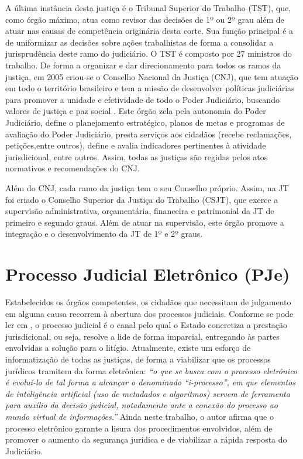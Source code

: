 A última instância desta justiça é o Tribunal Superior do Trabalho (TST), que, como órgão máximo, atua como revisor das decisões de 1º ou 2º grau além de atuar nas causas de competência originária desta corte.  Sua função principal é a de uniformizar as decisões sobre ações trabalhistas de forma a consolidar a jurisprudência deste ramo do judiciário. O TST é composto por 27 ministros do trabalho.
De forma a organizar e dar direcionamento para todos os ramos da justiça, em 2005 criou-se o Conselho Nacional da Justiça (CNJ), que tem atuação em todo o território brasileiro e tem a missão de desenvolver políticas judiciárias para promover a unidade e efetividade de todo o Poder Judiciário, buscando valores de justiça e paz social \cite{sitecnj}. Este órgão zela pela autonomia do Poder Judiciário, define o planejamento estratégico, planos de metas e programas de avaliação do Poder Judiciário, presta serviços aos cidadãos (recebe reclamações, petições,entre outros), define e avalia indicadores pertinentes à atividade jurisdicional, entre outros.   Assim, todas as justiças são regidas pelos atos normativos e recomendações do CNJ.      

Além do CNJ, cada ramo da justiça tem o seu Conselho próprio. Assim, na JT foi criado o Conselho Superior da Justiça do Trabalho (CSJT), que exerce a supervisão administrativa, orçamentária, financeira e patrimonial da JT de primeiro e segundo graus. Além de atuar na supervisão, este órgão promove a integração e o desenvolvimento da JT de 1º e 2º graus. 


\section{Processo Judicial Eletrônico (PJe)}%

Estabelecidos os órgãos competentes, os cidadãos que necessitam de julgamento em alguma causa recorrem à abertura dos processos judiciais. Conforme se pode ler em \cite{carvalho_o_2017}, o processo judicial é o canal pelo qual o Estado concretiza a prestação jurisdicional, ou seja, resolve a lide de forma imparcial, entregando às partes envolvidas a solução para o litígio. Atualmente, existe um esforço de informatização de todas as justiças, de forma a viabilizar que os processos jurídicos tramitem da forma eletrônica: \textit{``o que se busca com o processo eletrônico é evoluí-lo de tal forma a alcançar o denominado “i-processo”, em que elementos de inteligência artificial (uso de metadados e algoritmos) servem de ferramenta para auxílio da decisão judicial, notadamente ante a conexão do processo ao mundo virtual de informações.''} Ainda neste trabalho, o autor afirma que o processo eletrônico garante a lisura dos procedimentos envolvidos, além de promover o aumento da segurança jurídica e de viabilizar a rápida resposta do Judiciário.  

